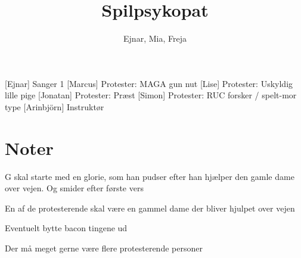\documentclass[a4paper,11pt]{article}
\title{Spilpsykopat}
\author{Ejnar, Mia, Freja}
\begin{document}
\maketitle

\begin{roles}
[Ejnar] Sanger 1
[Marcus] Protester: MAGA gun nut
[Lise] Protester: Uskyldig lille pige
[Jonatan] Protester: Præst
[Simon] Protester: RUC forsker / spelt-mor type
[Arinbjörn] Instruktør
\end{roles}
\section*{Noter}
G skal starte med en glorie, som han pudser efter han hjælper den gamle dame over vejen. Og smider efter første vers

En af de protesterende skal være en gammel dame der bliver hjulpet over vejen

Eventuelt bytte bacon tingene ud 

Der må meget gerne være flere protesterende personer

\begin{props}
\prop{}
\prop{}
\end{props}
\end{document}
